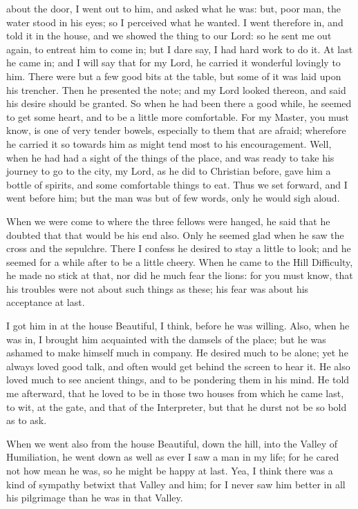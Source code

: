 about the door, I went out to him, and asked what he was: but, poor man, the water stood in his eyes; so I perceived what he wanted. I went therefore in, and told it in the house, and we showed the thing to our Lord: so he sent me out again, to entreat him to come in; but I dare say, I had hard work to do it. At last he came in; and I will say that for my Lord, he carried it wonderful lovingly to him. There were but a few good bits at the table, but some of it was laid upon his trencher. Then he presented the note; and my Lord looked thereon, and said his desire should be granted. So when he had been there a good while, he seemed to get some heart, and to be a little more comfortable. For my Master, you must know, is one of very tender bowels, especially to them that are afraid; wherefore he carried it so towards him as might tend most to his encouragement. Well, when he had had a sight of the things of the place, and was ready to take his journey to go to the city, my Lord, as he did to Christian before, gave him a bottle of spirits, and some comfortable things to eat. Thus we set forward, and I went before him; but the man was but of few words, only he would sigh aloud.

When we were come to where the three fellows were hanged, he said that he doubted that that would be his end also. Only he seemed glad when he saw the cross and the sepulchre. There I confess he desired to stay a little to look; and he seemed for a while after to be a little cheery. When he came to the Hill Difficulty, he made no stick at that, nor did he much fear the lions: for you must know, that his troubles were not about such things as these; his fear was about his acceptance at last.

I got him in at the house Beautiful, I think, before he was willing. Also, when he was in, I brought him acquainted with the damsels of the place; but he was ashamed to make himself much in company. He desired much to be alone; yet he always loved good talk, and often would get behind the screen to hear it. He also loved much to see ancient things, and to be pondering them in his mind. He told me afterward, that he loved to be in those two houses from which he came last, to wit, at the gate, and that of the Interpreter, but that he durst not be so bold as to ask.

When we went also from the house Beautiful, down the hill, into the Valley of Humiliation, he went down as well as ever I saw a man in my life; for he cared not how mean he was, so he might be happy at last. Yea, I think there was a kind of sympathy betwixt that Valley and him; for I never saw him better in all his pilgrimage than he was in that Valley.


